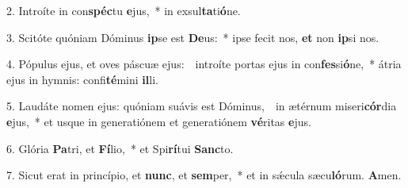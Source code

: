 
2. Introíte in con\textbf{spéc}tu \textbf{e}jus,~* in exsul\textbf{ta}ti\textbf{ó}ne.

3. Scitóte quóniam Dóminus \textbf{ip}se est \textbf{De}us:~* ipse fecit nos, \textbf{et} non \textbf{ip}si nos.

4. Pópulus ejus, et oves páscuæ ejus:~\GreDagger\ introíte portas ejus in con\textbf{fes}si\textbf{ó}ne,~* átria ejus in hymnis: confi\textbf{té}mini \textbf{il}li.

5. Laudáte nomen ejus: quóniam suávis est Dóminus,~\GreDagger\ in ætérnum miseri\textbf{cór}dia \textbf{e}jus,~* et usque in generatiónem et generatiónem \textbf{vé}ritas \textbf{e}jus.

6. Glória \textbf{Pa}tri, et \textbf{Fí}lio,~* et Spi\textbf{rí}tui \textbf{Sanc}to.

7. Sicut erat in princípio, et \textbf{nunc}, et \textbf{sem}per,~* et in s\'{\ae}cula sæcu\textbf{ló}rum. \textbf{A}men.